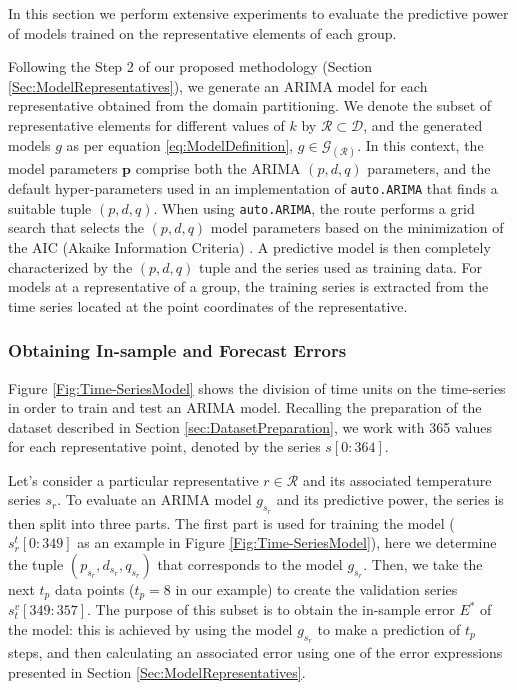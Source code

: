 In this section we perform extensive experiments to evaluate the predictive power of models trained on the representative elements of each group. 

Following the Step 2 of our proposed methodology (Section \ref{Sec:ModelRepresentatives}), we generate an ARIMA model for each representative obtained from the domain partitioning. We denote the subset of representative elements for different values of $k$ by $\mathcal{R} \subset \mathcal{D}$, and the generated models $g$ as per equation \ref{eq:ModelDefinition}, $g \in \mathcal{G}_{(\mathcal{R})}$. 
In this context, the model parameters $\mathbf{p}$ comprise both the ARIMA $(p, d, q)$ parameters, and the default hyper-parameters used in an implementation of \texttt{auto.ARIMA} that finds a suitable tuple $(p, d, q)$. When using \texttt{auto.ARIMA}, the route performs a grid search that selects the $(p, d, q)$ model parameters based on the minimization of the AIC (Akaike Information Criteria) \cite{Hyndman2008}. A predictive model is then completely characterized by the $(p, d, q)$ tuple and the series used as training data. For models at a representative of a group, the training series is extracted from the time series located at the point coordinates of the representative.

\subsubsection{Obtaining In-sample and Forecast Errors}
\label{sec:InSampleForecastErrors}

Figure \ref{Fig:Time-SeriesModel} shows the division of time units on the time-series in order to train and test an ARIMA model. Recalling the preparation of the dataset described in Section \ref{sec:DatasetPreparation}, we work with 365 values for each representative point, denoted by the series $s[0:364]$.

Let's consider a particular representative $r \in \mathcal{R}$ and its associated temperature series $s_r$. To evaluate an ARIMA model $g_{s_r}$ and its predictive power, the series is then split into three parts. The first part is used for training the model ($s^t_r[0:349]$ as an example in Figure \ref{Fig:Time-SeriesModel}), here we determine the tuple $(p_{s_r}, d_{s_r}, q_{s_r})$ that corresponds to the model $g_{s_r}$. Then, we take the next $t_p$ data points ($t_p = 8$ in our example) to create the validation series $s^v_t[349:357]$. The purpose of this subset is to obtain the in-sample error ${E^*}$ of the model: this is achieved by using the model $g_{s_r}$ to make a prediction of $t_p$ steps, and then calculating an associated error using one of the error expressions presented in Section \ref{Sec:ModelRepresentatives}.

